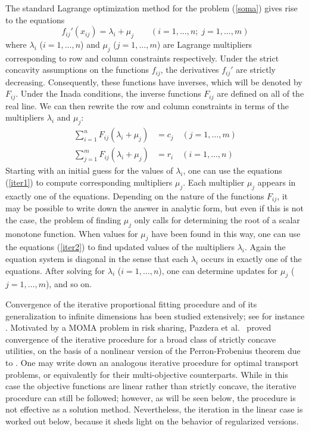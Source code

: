 \documentclass{article}
\theoremstyle{definition}
\begin{document}
The standard Lagrange optimization method for the problem (\ref{soma}) gives rise to the equations
\begin{equation}
f_{ij}'(x_{ij}) = \lambda_i + \mu_j \qquad (i=1,\dots,n;\; j = 1,\dots,m)
\end{equation}
where $\lambda_i$ ($i=1,\dots,n$) and $\mu_j$ ($j=1,\dots,m$) are Lagrange multipliers corresponding to row and column constraints respectively. Under the strict concavity assumptions on the functions $f_{ij}$, the derivatives $f_{ij}'$ are strictly decreasing. Consequently, these functions have inverses, which will be denoted by $F_{ij}$. Under the Inada conditions, the inverse functions $F_{ij}$ are defined on all of the real line. We can then rewrite the row and column constraints in terms of the multipliers $\lambda_i$ and $\mu_j$:
\begin{subequations}
\begin{align}
\sum_{i=1}^n F_{ij}(\lambda_i + \mu_j) & = c_j \quad (j = 1,\dots,m) \label{iter1} \\
\sum_{j=1}^m F_{ij}(\lambda_i + \mu_j) & = r_i \quad (i = 1,\dots,n) \label{iter2}
\end{align}
\end{subequations}
Starting with an initial guess for the values of $\lambda_i$, one can use the equations (\ref{iter1}) to compute corresponding multipliers $\mu_j$. Each multiplier $\mu_j$ appears in exactly one of the equations. Depending on the nature of the functions $F_{ij}$, it may be possible to write down the answer in analytic form, but even if this is not the case, the problem of finding $\mu_j$ only calls for determining the root of a scalar monotone function. When values for $\mu_j$ have been found in this way, one can use the equations (\ref{iter2}) to find updated values of the multipliers $\lambda_i$. Again the equation system is diagonal in the sense that each $\lambda_i$ occurs in exactly one of the equations. After solving for $\lambda_i$ ($i=1,\dots,n$), one can determine updates for $\mu_j$ ($j = 1,\dots,m$), and so on.

Convergence of the iterative proportional fitting procedure and of its generalization to infinite dimensions has been studied extensively; see for instance \cite{Brown,Sinkhorn,Ireland,Fienberg,Csiszar,Rueschendorf,Bauschke}. Motivated by a MOMA problem in risk sharing, Pazdera et al.\ \cite{PSW1} proved convergence of the iterative procedure for a broad class of strictly concave utilities, on the basis of a nonlinear version of the Perron-Frobenius theorem due to \cite{Oshime}.
One may write down an analogous iterative procedure for optimal transport problems, or equivalently for their multi-objective counterparts. While in this case the objective functions are linear rather than strictly concave, the iterative procedure can still be followed; however, as will be seen below, the procedure is not effective as a solution method. Nevertheless, the iteration in the linear case is worked out below, because it sheds light on the behavior of regularized versions.
\end{document}
